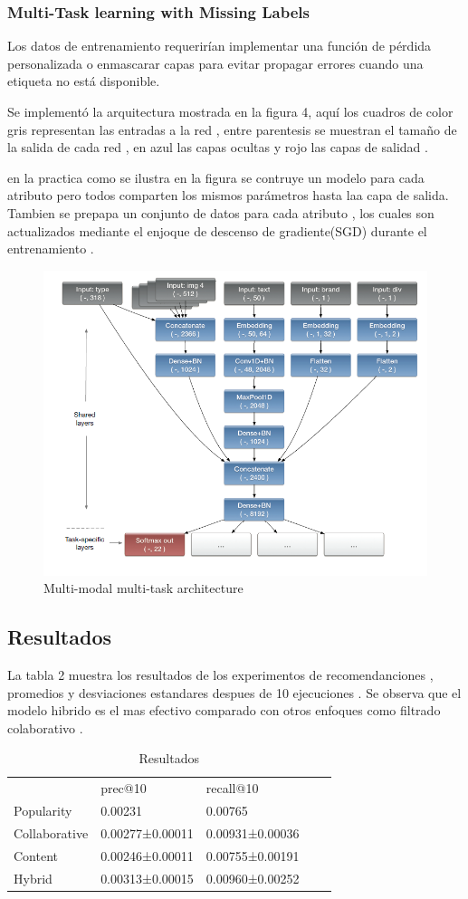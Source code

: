 \documentclass[conference]{IEEEtran}
\begin{document}
\subsubsection{Multi-Task learning with Missing Labels}
Los datos de entrenamiento requerirían implementar una función de pérdida personalizada o enmascarar capas para evitar propagar errores cuando una etiqueta no está disponible.

Se implementó la arquitectura mostrada en la figura 4, aquí los cuadros de color gris representan las entradas a la red  , entre parentesis se muestran el tamaño de la salida de cada red , en azul las capas ocultas y rojo las capas de salidad .  

en la practica como se ilustra en la figura se contruye un modelo para cada atributo pero todos comparten los mismos parámetros hasta laa capa de salida. Tambien se prepapa un conjunto de datos para cada atributo , los cuales son actualizados mediante el enjoque de descenso de gradiente(SGD) durante el entrenamiento . 
\begin{figure}
\centerline{\includegraphics[width=\textwidth,width=9cm]{figura4.png}}
\caption{Multi-modal multi-task architecture}
\label{fig}
\end{figure}

\subsection{Resultados}


La tabla 2 muestra los resultados de los experimentos de recomendanciones , promedios y desviaciones estandares despues de 10 ejecuciones . Se observa que el modelo hibrido es el mas efectivo comparado con otros enfoques como filtrado colaborativo .



\begin{table}[]
\centering
\caption{Resultados}
\begin{tabular}{lllll}
		 & prec@10  & recall@10\\
Popularity        & 0.00231 & 0.00765\\
Collaborative        & 0.00277±0.00011& 0.00931±0.00036 \\
Content        & 0.00246±0.00011 & 0.00755±0.00191\\
Hybrid    & 0.00313±0.00015   & 0.00960±0.00252 
\end{tabular}
\end{table}
\end{document}
